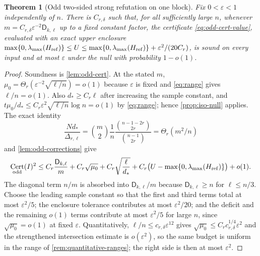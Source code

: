 \documentclass[11pt]{article}
\newtheorem{theorem}{Theorem}[section]
\theoremstyle{definition}
\theoremstyle{remark}
\newcommand{\1}{\mathbf 1}
\newcommand{\eps}{\varepsilon}
\newcommand{\Dkl}{\mathsf D_{k,\ell}}
\DeclareMathOperator{\Cert}{Cert}
\numberwithin{equation}{section}
\begin{document}
\begin{theorem}[Odd two-sided strong refutation on one block]\label{thm:odd-one-block}
Fix $0<\eps<1$ independently of $n$.  There is $C_{r,\delta}$ such that,
for all sufficiently large $n$, whenever
$m=C_{r,\delta}\eps^{-2}\Dkl$ up to a fixed constant factor, the
certificate \cref{eq:odd-cert-value}, evaluated with an exact upper
enclosure
$\max\{0,\lambda_{\max}(H_{\rm ref})\}\le U
\le\max\{0,\lambda_{\max}(H_{\rm ref})\}+\eps^2/(20C_r)$, is sound on every input
and at most $\eps$ under the null with probability $1-o(1)$.
\end{theorem}
\begin{proof}
Soundness is \cref{lem:odd-cert}.  At the stated $m$,
$\mu_0=\Theta_r(\eps^{-2}\sqrt{\ell/n})=o(1)$ because $\eps$ is fixed and
\cref{eq:range} gives $\ell/n=o(1)$.  Also $d_*\ge C_r\ell$ after
increasing the sample constant, and
$t\mu_0/d_*\le C_r\eps^2\sqrt{\ell/n}\log n=o(1)$ by
\cref{eq:range}; hence \cref{prop:iso-null} applies.  The exact identity
\[
 \frac{Nd_*}{\Delta_{r,\ell}}
 =\binom m2\frac1n
   \frac{\binom{n-1-2r}{2r}}{\binom{n-1}{2r}}
 =\Theta_r(m^2/n)
\]
and \cref{lem:odd-corrections} give
\begin{equation}\label{eq:odd-cert-tight}
 \Cert_{\rm odd}(I)^2
 \le C_r\frac{\Dkl}{m}
 +C_r\sqrt{\mu_0}
 +C_r\sqrt{\frac\ell{d_*}}
 +C_r\bigl(U-\max\{0,\lambda_{\max}(H_{\rm ref})\}\bigr)
 +o(1).
\end{equation}
The diagonal term $n/m$ is absorbed into $\Dkl/m$ because
$\Dkl\ge n$ for $\ell\le n/3$.  Choose the leading sample constant so
that the first and third terms total at most $\eps^2/5$; the enclosure
tolerance contributes at most $\eps^2/20$; and the deficit and the
remaining $o(1)$ terms contribute at most $\eps^2/5$ for large $n$,
since $\sqrt{\mu_0}=o(1)$ at fixed $\eps$.  Quantitatively,
$\ell/n\le c_{r,\delta}\eps^{12}$ gives
$\sqrt{\mu_0}\le C_rc_{r,\delta}^{1/4}\eps^2$ and the strengthened
intersection estimate is $o(\eps^2)$, so the same budget is uniform in
the range of \cref{rem:quantitative-ranges}; the right side is then at
most $\eps^2$.
\end{proof}
\end{document}
